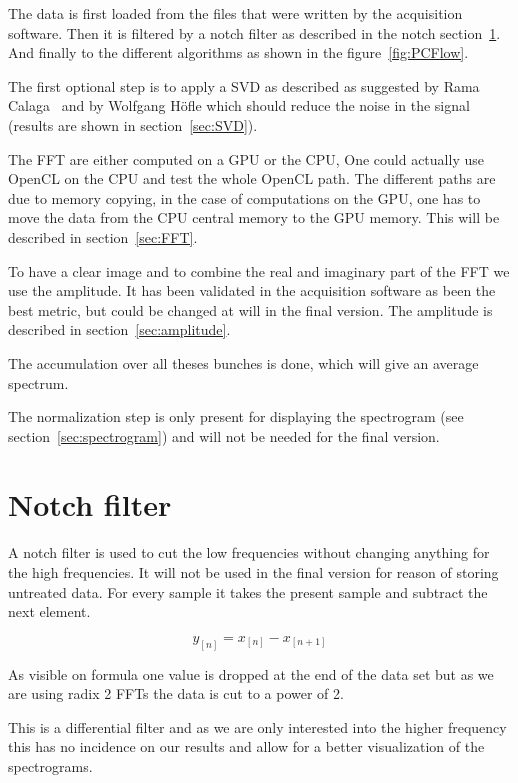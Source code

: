 The data is first loaded from the files that were written by the acquisition software. Then it is filtered by a notch filter as described in the notch section~\ref{sec:notch}. And finally to the different algorithms as shown in the figure~\ref{fig:PCFlow}.

The first optional step is to apply a \gls{SVD} as described as suggested by Rama Calaga~\cite{PhysRevSTAB.7.042801} and by Wolfgang H{\"o}f\/le\cite{HofleChamonix12} which should reduce the noise in the signal (results are shown in section~\ref{sec:SVD}).

The \gls{FFT} are either computed on a \gls{GPU} or the \gls{CPU}, One could actually use \gls{OpenCL} on the \gls{CPU} and test the whole \gls{OpenCL} path. The different paths are due to memory copying, in the case of computations on the \gls{GPU}, one has to move the data from the \gls{CPU} central memory to the \gls{GPU} memory. This will be described in section~\ref{sec:FFT}.

To have a clear image and to combine the real and imaginary part of the \gls{FFT} we use the amplitude. It has been validated in the acquisition software as been the best metric, but could be changed at will in the final version. The amplitude is described in section~\ref{sec:amplitude}.

The accumulation over all theses bunches is done, which will give an average spectrum.

The normalization step is only present for displaying the spectrogram (see section~\ref{sec:spectrogram}) and will not be needed for the final version.

\section{Notch filter}
\label{sec:notch}

A notch filter is used to cut the low frequencies without changing anything for the high frequencies. It will not be used in the final version for reason of storing untreated data. For every sample it takes the present sample and subtract the next element. 

$$y_{[n]} = x_{[n]} - x_{[n + 1]}$$

As visible on formula one value is dropped at the end of the data set but as we are using radix 2 \glspl{FFT} the data is cut to a power of 2.

This is a differential filter and as we are only interested into the higher frequency this has no incidence on our results and allow for a better visualization of the spectrograms.


